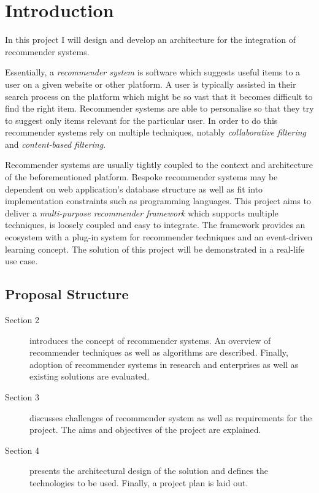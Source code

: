 \chapter{Introduction}

In this project I will design and develop an architecture for the integration of recommender systems.

Essentially, a \emph{recommender system} is software which suggests useful items to a user on a given website or other platform. A user is typically assisted in their search process on the platform which might be so vast that it becomes difficult to find the right item. Recommender systems are able to personalise so that they try to suggest only items relevant for the particular user. In order to do this recommender systems rely on multiple techniques, notably \emph{collaborative filtering} and \emph{content-based filtering}.

Recommender systems are usually tightly coupled to the context and architecture of the beforementioned platform. Bespoke recommender systems may be dependent on web application's database structure as well as fit into implementation constraints such as programming languages. This project aims to deliver a \emph{multi-purpose recommender framework} which supports multiple techniques, is loosely coupled and easy to integrate. The framework provides an ecosystem with a plug-in system for recommender techniques and an event-driven learning concept. The solution of this project will be demonstrated in a real-life use case.

\section{Proposal Structure}

\begin{description}
    \item[Section 2] introduces the concept of recommender systems. An overview of recommender techniques as well as algorithms are described. Finally, adoption of recommender systems in research and enterprises as well as existing solutions are evaluated.
    \item[Section 3] discusses challenges of recommender system as well as requirements for the project. The aims and objectives of the project are explained.
    \item[Section 4] presents the architectural design of the solution and defines the technologies to be used. Finally, a project plan is laid out.
\end{description}